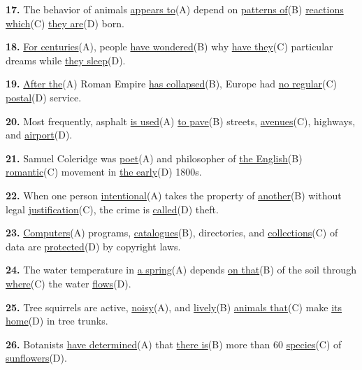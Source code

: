 \documentclass[12pt]{article}
\begin{document}
\par
\vspace{\questionblockgap}
\noindent\textbf{17.} The behavior of animals \uline{appears to}(A) depend on \uline{patterns of}(B) \uline{reactions which}(C) \uline{they are}(D) born.
\par
\vspace{\questionblockgap}
\noindent\textbf{18.} \uline{For centuries}(A), people \uline{have wondered}(B) why \uline{have they}(C) particular dreams while \uline{they sleep}(D).
\par
\vspace{\questionblockgap}
\noindent\textbf{19.} \uline{After the}(A) Roman Empire \uline{has collapsed}(B), Europe had \uline{no regular}(C) \uline{postal}(D) service.
\par
\vspace{\questionblockgap}
\noindent\textbf{20.} Most frequently, asphalt \uline{is used}(A) \uline{to pave}(B) streets, \uline{avenues}(C), highways, and \uline{airport}(D).
\par
\vspace{\questionblockgap}
\noindent\textbf{21.} Samuel Coleridge was \uline{poet}(A) and philosopher of \uline{the English}(B) \uline{romantic}(C) movement in \uline{the early}(D) 1800s.
\par
\vspace{\questionblockgap}
\noindent\textbf{22.} When one person \uline{intentional}(A) takes the property of \uline{another}(B) without legal \uline{justification}(C), the crime is \uline{called}(D) theft.
\par
\vspace{\questionblockgap}
\noindent\textbf{23.} \uline{Computers}(A) programs, \uline{catalogues}(B), directories, and \uline{collections}(C) of data are \uline{protected}(D) by copyright laws.
\par
\vspace{\questionblockgap}
\noindent\textbf{24.} The water temperature in \uline{a spring}(A) depends \uline{on that}(B) of the soil through \uline{where}(C) the water \uline{flows}(D).
\par
\vspace{\questionblockgap}
\noindent\textbf{25.} Tree squirrels are active, \uline{noisy}(A), and \uline{lively}(B) \uline{animals that}(C) make \uline{its home}(D) in tree trunks.
\par
\vspace{\questionblockgap}
\noindent\textbf{26.} Botanists \uline{have determined}(A) that \uline{there is}(B) more than 60 \uline{species}(C) of \uline{sunflowers}(D).
\end{document}
